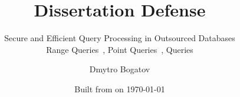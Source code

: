 \title{Dissertation Defense}

\subtitle{
	Secure and Efficient Query Processing in Outsourced Databases \\
	{\small Range Queries~\cite{ore-benchmark-17, epsolute}, Point Queries~\cite{epsolute}, \knn{} Queries}
}

\date{Built from \href{https://git.dbogatov.org/bu/defense/presentation/commit/\version}{\emph{\version}} on \today}

\author{Dmytro Bogatov \\ }


\def\wm{\texttt{[image: coat-of-arms-1]}}
